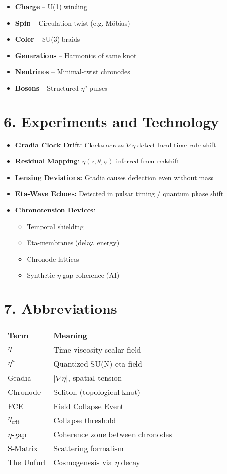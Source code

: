\documentclass[12pt]{article}
\begin{document}
\begin{itemize}
\item \textbf{Charge} – U(1) winding
\item \textbf{Spin} – Circulation twist (e.g. Möbius)
\item \textbf{Color} – SU(3) braids
\item \textbf{Generations} – Harmonics of same knot
\item \textbf{Neutrinos} – Minimal-twist chronodes
\item \textbf{Bosons} – Structured $\eta^a$ pulses
\end{itemize}

\section*{6. Experiments and Technology}

\begin{itemize}
\item \textbf{Gradia Clock Drift:} Clocks across $\nabla \eta$ detect local time rate shift
\item \textbf{Residual Mapping:} $\eta(z, \theta, \phi)$ inferred from redshift
\item \textbf{Lensing Deviations:} Gradia causes deflection even without mass
\item \textbf{Eta-Wave Echoes:} Detected in pulsar timing / quantum phase shift
\item \textbf{Chronotension Devices:}
  \begin{itemize}
    \item Temporal shielding
    \item Eta-membranes (delay, energy)
    \item Chronode lattices
    \item Synthetic $\eta$-gap coherence (AI)
  \end{itemize}
\end{itemize}

\section*{7. Abbreviations}

\begin{tabular}{@{}ll@{}}
\toprule
Term & Meaning \\
\midrule
$\eta$ & Time-viscosity scalar field \\
$\eta^a$ & Quantized SU(N) eta-field \\
Gradia & $|\nabla \eta|$, spatial tension \\
Chronode & Soliton (topological knot) \\
FCE & Field Collapse Event \\
$\eta_{\text{crit}}$ & Collapse threshold \\
$\eta$-gap & Coherence zone between chronodes \\
S-Matrix & Scattering formalism \\
The Unfurl & Cosmogenesis via $\eta$ decay \\
\bottomrule
\end{tabular}
\end{document}
